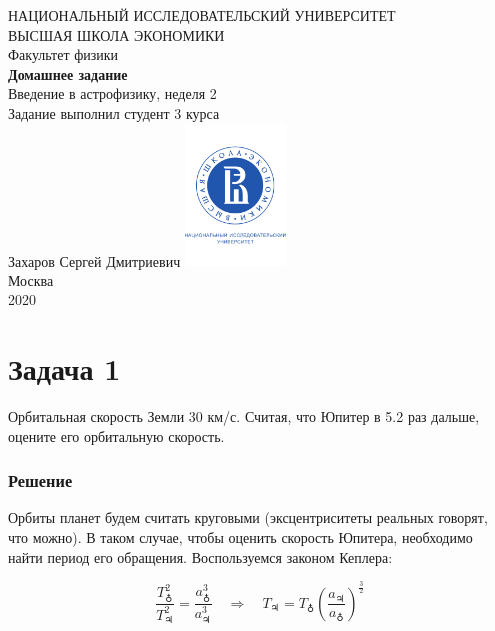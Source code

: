 \documentclass[a4paper, 12pt]{article}
\newcommand{\RN}[1]
{\MakeUppercase{\romannumeral #1}} %
\newcommand{\qrq}
{\ensuremath{\quad \Rightarrow \quad}} %
\begin{document}
	\begin{titlepage}
		\begin{center}
			$$$$
			$$$$
			$$$$
			$$$$
			{\Large{НАЦИОНАЛЬНЫЙ ИССЛЕДОВАТЕЛЬСКИЙ УНИВЕРСИТЕТ}}\\
			\vspace{0.1cm}
			{\Large{ВЫСШАЯ ШКОЛА ЭКОНОМИКИ}}\\
			\vspace{0.25cm}
			{\large{Факультет физики}}\\
			\vspace{5.5cm}
			{\Huge\textbf{{Домашнее задание}}}\\%
			\vspace{1cm}
			{\LARGE{Введение в астрофизику, неделя 2}}\\%
			\vspace{2cm}
			{Задание выполнил студент 3 курса}\\
			{Захаров Сергей Дмитриевич}
			\vfill
			\includegraphics[width = 0.2\textwidth]{HSElogo}\\
			\vfill
			Москва\\
			2020
		\end{center}
	\end{titlepage}

\section*{Задача 1}

Орбитальная скорость Земли 30 км/с. Считая, что Юпитер в 5.2 раз дальше, оцените его орбитальную скорость. 

\subsubsection*{Решение}

Орбиты планет будем считать круговыми (эксцентриситеты реальных говорят, что можно). В таком случае, чтобы оценить скорость Юпитера, необходимо найти период его обращения. Воспользуемся \RN{3} законом Кеплера:

\begin{equation}
	\frac{T_{\earth}^2}{T_{\jupiter}^2} = \frac{a_{\earth}^3}{a_{\jupiter}^3} \qrq T_{\jupiter} = T_{\earth} \left(\frac{a_{\jupiter}}{a_{\earth}}\right)^{\frac{3}{2}}
\end{equation}
\end{document}
